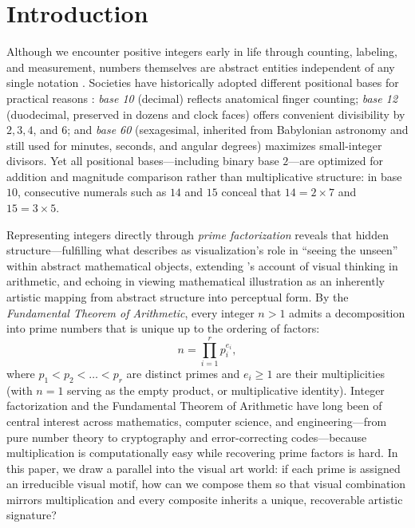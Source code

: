 \documentclass[]{interact}
\theoremstyle{plain}
\theoremstyle{definition}
\theoremstyle{remark}
\begin{document}
\section{Introduction}
Although we encounter positive integers early in life through counting, labeling, and measurement, numbers themselves are abstract entities independent of any single notation \citep{menninger1969number,reimann2024visual}. Societies have historically adopted different positional bases for practical reasons \citep{ifrah2000universal,menninger1969number}: \emph{base 10} (decimal) reflects anatomical finger counting; \emph{base 12} (duodecimal, preserved in dozens and clock faces) offers convenient divisibility by $2, 3, 4$, and $6$; and \emph{base 60} (sexagesimal, inherited from Babylonian astronomy and still used for minutes, seconds, and angular degrees) maximizes small-integer divisors. Yet all positional bases—including binary base $2$—are optimized for addition and magnitude comparison rather than multiplicative structure: in base $10$, consecutive numerals such as $14$ and $15$ conceal that $14 = 2 \times 7$ and $15 = 3 \times 5$.

Representing integers directly through \emph{prime factorization} reveals that hidden structure—fulfilling what \citet{arcavi2003role} describes as visualization's role in ``seeing the unseen'' within abstract mathematical objects, extending \citeauthor{giaquinto2007visual}'s \citeyearpar{giaquinto2007visual} account of visual thinking in arithmetic, and echoing \citet{harriss2022art} in viewing mathematical illustration as an inherently artistic mapping from abstract structure into perceptual form. By the \emph{Fundamental Theorem of Arithmetic}, every integer $n > 1$ admits a decomposition into prime numbers that is unique up to the ordering of factors:
\[
  n = \prod_{i=1}^{r} p_i^{e_i},
\]
where $p_1 < p_2 < \dots < p_r$ are distinct primes and $e_i \ge 1$ are their multiplicities (with $n = 1$ serving as the empty product, or multiplicative identity). Integer factorization and the Fundamental Theorem of Arithmetic have long been of central interest across mathematics, computer science, and engineering—from pure number theory to cryptography and error-correcting codes—because multiplication is computationally easy while recovering prime factors is hard. In this paper, we draw a parallel into the visual art world: if each prime is assigned an irreducible visual motif, how can we compose them so that visual combination mirrors multiplication and every composite inherits a unique, recoverable artistic signature?
\end{document}
